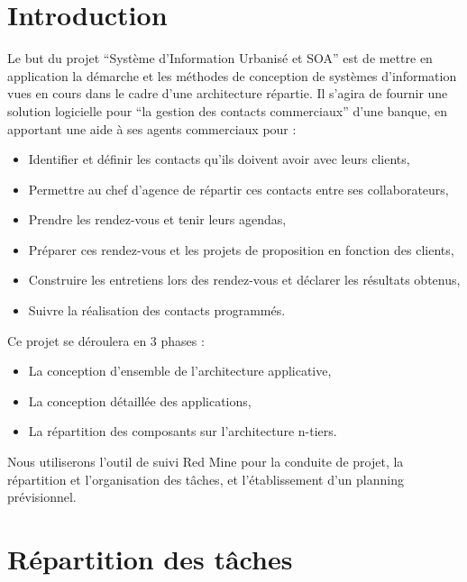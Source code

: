 
\section{Introduction}

Le but du projet ``Système d'Information Urbanisé et SOA'' est de mettre en application la démarche et
les méthodes de conception de systèmes d'information vues en cours dans le cadre d'une architecture répartie.
Il s'agira de fournir une solution logicielle pour ``la gestion des contacts commerciaux'' d'une banque,
en apportant une aide à ses agents commerciaux pour :

\begin{itemize}
\item Identifier et définir les contacts qu'ils doivent avoir avec leurs clients,
\item Permettre au chef d'agence de répartir ces contacts entre ses collaborateurs,
\item Prendre les rendez-vous et tenir leurs agendas,
\item Préparer ces rendez-vous et les projets de proposition en fonction des clients,
\item Construire les entretiens lors des rendez-vous et déclarer les résultats obtenus,
\item Suivre la réalisation des contacts programmés.
\end{itemize}

Ce projet se déroulera en 3 phases :

\begin{itemize}
\item La conception d'ensemble de l'architecture applicative,
\item La conception détaillée des applications,
\item La répartition des composants sur l'architecture n-tiers.
\end{itemize}

Nous utiliserons l'outil de suivi Red Mine pour la conduite de
projet, la répartition et l'organisation des tâches, et
l'établissement d'un planning prévisionnel.

\section{Répartition des tâches}


